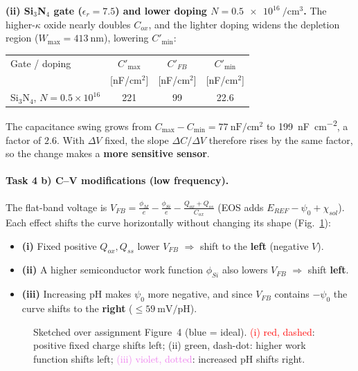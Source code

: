 \textbf{(ii) Si$_3$N$_4$ gate ($\epsilon_r=7.5$) and lower doping $N=\SI{0.5e16}{\per\cubic\cm}$.}
The higher-$\kappa$ oxide nearly doubles $C_{ox}$, and the lighter doping widens the depletion region
($W_{\max}=\SI{413}{\nm}$), lowering $C'_{\min}$:
\begin{center}\small
\begin{tabular}{lccc}
\toprule
Gate / doping & $C'_{\max}$ & $C'_{FB}$ & $C'_{\min}$ \\
 & [nF/cm$^2$] & [nF/cm$^2$] & [nF/cm$^2$] \\
\midrule
Si$_3$N$_4$, $N=0.5{\times}10^{16}$ & 221 & 99 & 22.6 \\
\bottomrule
\end{tabular}
\end{center}
The capacitance swing grows from $C_{\max}-C_{\min}=\SI{77}{\nano\farad\per\square\cm}$ to
\SI{199}{\nano\farad\per\square\cm}, a factor of $2.6$. With $\Delta V$ fixed, the slope
$\Delta C/\Delta V$ therefore rises by the same factor, so the change makes a
\textbf{more sensitive sensor}.

\paragraph{Task 4 b) C--V modifications (low frequency).}
The flat-band voltage is
$V_{FB}=\tfrac{\phi_M}{e}-\tfrac{\phi_{Si}}{e}-\tfrac{Q_{ox}+Q_{ss}}{C_{ox}}$ (EOS adds
$E_{REF}-\psi_0+\chi_{sol}$). Each effect shifts the curve horizontally without changing its shape
(Fig.~\ref{fig:cv-mods}):
\begin{itemize}[nosep,leftmargin=1.4em]
\item \textbf{(i)} Fixed positive $Q_{ox},Q_{ss}$ lower $V_{FB}$ $\Rightarrow$ shift to the
\textbf{left} (negative $V$).
\item \textbf{(ii)} A higher semiconductor work function $\phi_{Si}$ also lowers $V_{FB}$
$\Rightarrow$ shift \textbf{left}.
\item \textbf{(iii)} Increasing pH makes $\psi_0$ more negative, and since $V_{FB}$ contains
$-\psi_0$ the curve shifts to the \textbf{right} ($\le\SI{59}{\milli\volt}/\mathrm{pH}$).
\end{itemize}

\begin{figure}[H]
\centering

\caption{Sketched over assignment Figure~4 (blue = ideal). \textcolor{red}{(i) red, dashed}: positive
fixed charge shifts left; \textcolor{green!55!black}{(ii) green, dash-dot}: higher work function
shifts left; \textcolor{violet}{(iii) violet, dotted}: increased pH shifts right.}
\label{fig:cv-mods}
\end{figure}

